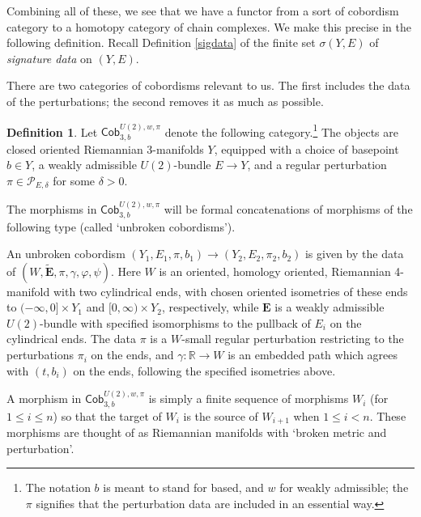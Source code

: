 \documentclass{memo-l}
\theoremstyle{definition}
\newtheorem{definition}[theorem]{Definition}
\theoremstyle{remark}
\numberwithin{section}{chapter}
\numberwithin{equation}{chapter}
\begin{document}
Combining all of these, we see that we have a functor from a sort of cobordism category to a homotopy category of chain complexes. We make this precise in the following definition. Recall Definition \ref{sigdata} of the finite set $\sigma(Y,E)$ of \textit{signature data} on $(Y, E)$.

There are two categories of cobordisms relevant to us. The first includes the data of the perturbations; the second removes it as much as possible.

\begin{definition}\label{cobcat}
Let $\mathsf{Cob}_{3,b}^{U(2),w,\pi}$ denote the following category.\footnote{The notation $b$ is meant to stand for based, and $w$ for weakly admissible; the $\pi$ signifies that the perturbation data are included in an essential way.} The objects are closed oriented Riemannian 3-manifolds $Y$, equipped with a choice of basepoint $b \in Y$, a weakly admissible $U(2)$-bundle $E \to Y$, and a regular perturbation $\pi \in \mathcal P_{E, \delta}$ for some $\delta > 0$. 

The morphisms in $\mathsf{Cob}_{3,b}^{U(2),w,\pi}$ will be formal concatenations of morphisms of the following type (called `unbroken cobordisms').

An unbroken cobordism $(Y_1, E_1, \pi, b_1) \to (Y_2, E_2, \pi_2, b_2)$ is given by the data of $(W, \widetilde{\mathbf{E}}, \pi,\gamma, \varphi,\psi)$. Here $W$ is an oriented, homology oriented, Riemannian 4-manifold with two cylindrical ends, with chosen oriented isometries of these ends to $(-\infty, 0] \times Y_1$ and $[0,\infty) \times Y_2$, respectively, while $\mathbf{E}$ is a weakly admissible $U(2)$-bundle with specified isomorphisms to the pullback of $E_i$ on the cylindrical ends. The data $\pi$ is a $W$-small regular perturbation restricting to the perturbations $\pi_i$ on the ends, and $\gamma: \mathbb R \to W$ is an embedded path which agrees with $(t, b_i)$ on the ends, following the specified isometries above.

A morphism in $\mathsf{Cob}_{3,b}^{U(2),w,\pi}$ is simply a finite sequence of morphisms $W_i$ (for $1 \leq i \leq n$) so that the target of $W_i$ is the source of $W_{i+1}$ when $1 \leq i < n$. These morphisms are thought of as Riemannian manifolds with `broken metric and perturbation'.


\end{definition}
\end{document}
